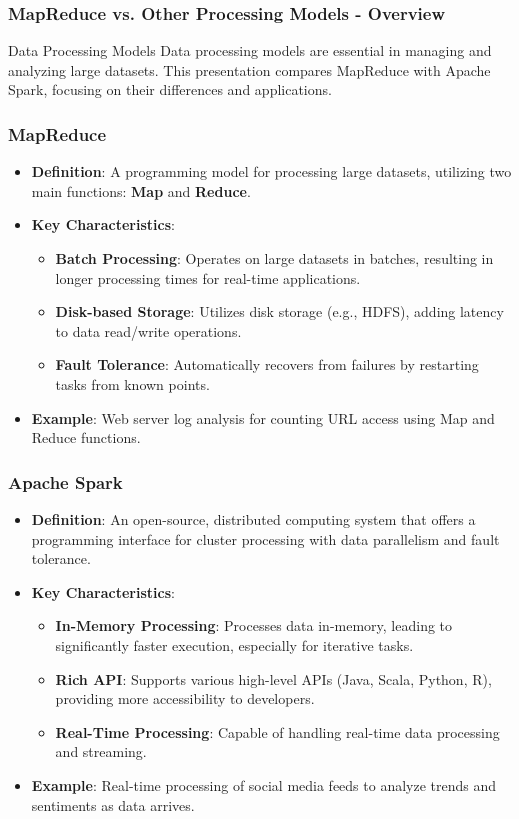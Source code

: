 \documentclass[aspectratio=169]{beamer}
\begin{document}
\begin{frame}[fragile]
    \frametitle{MapReduce vs. Other Processing Models - Overview}
    \begin{block}{Data Processing Models}
        Data processing models are essential in managing and analyzing large datasets. This presentation compares MapReduce with Apache Spark, focusing on their differences and applications.
    \end{block}
\end{frame}

\begin{frame}[fragile]
    \frametitle{MapReduce}
    \begin{itemize}
        \item \textbf{Definition}: A programming model for processing large datasets, utilizing two main functions: \textbf{Map} and \textbf{Reduce}.
        \item \textbf{Key Characteristics}:
            \begin{itemize}
                \item \textbf{Batch Processing}: Operates on large datasets in batches, resulting in longer processing times for real-time applications.
                \item \textbf{Disk-based Storage}: Utilizes disk storage (e.g., HDFS), adding latency to data read/write operations.
                \item \textbf{Fault Tolerance}: Automatically recovers from failures by restarting tasks from known points.
            \end{itemize}
        \item \textbf{Example}: Web server log analysis for counting URL access using Map and Reduce functions.
    \end{itemize}
\end{frame}

\begin{frame}[fragile]
    \frametitle{Apache Spark}
    \begin{itemize}
        \item \textbf{Definition}: An open-source, distributed computing system that offers a programming interface for cluster processing with data parallelism and fault tolerance.
        \item \textbf{Key Characteristics}:
            \begin{itemize}
                \item \textbf{In-Memory Processing}: Processes data in-memory, leading to significantly faster execution, especially for iterative tasks.
                \item \textbf{Rich API}: Supports various high-level APIs (Java, Scala, Python, R), providing more accessibility to developers.
                \item \textbf{Real-Time Processing}: Capable of handling real-time data processing and streaming.
            \end{itemize}
        \item \textbf{Example}: Real-time processing of social media feeds to analyze trends and sentiments as data arrives.
    \end{itemize}
\end{frame}
\end{document}
